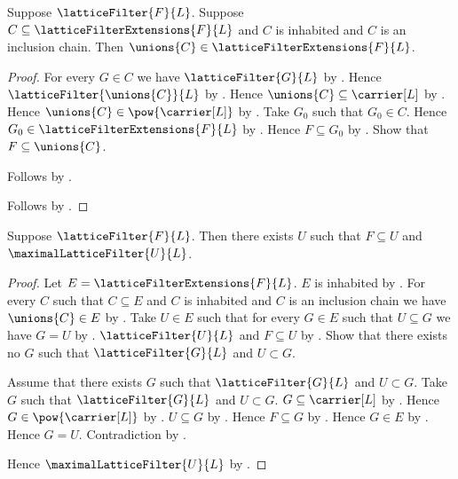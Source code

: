 \begin{theorem}\label{lattice_filter_extensions_chain_union}
    Suppose $\latticeFilter{F}{L}$.
    Suppose $C\subseteq\latticeFilterExtensions{F}{L}$ and
        $C$ is inhabited and $C$ is an inclusion chain.
    Then $\unions{C}\in\latticeFilterExtensions{F}{L}$.
\end{theorem}
\begin{proof}
    For every $G\in C$ we have $\latticeFilter{G}{L}$ by
        .
    Hence $\latticeFilter{\unions{C}}{L}$ by
        .
    Hence $\unions{C}\subseteq\carrier[L]$ by
        .
    Hence $\unions{C}\in\pow{\carrier[L]}$ by
        .
    Take $G_0$ such that $G_0\in C$.
    Hence $G_0\in\latticeFilterExtensions{F}{L}$ by .
    Hence $F\subseteq G_0$ by
        .
    Show that $F\subseteq\unions{C}$.
    \begin{subproof}
        Follows by .
    \end{subproof}
    Follows by .
\end{proof}

\begin{theorem}\label{lattice_filter_extension}
    Suppose $\latticeFilter{F}{L}$.
    Then there exists $U$ such that $F\subseteq U$ and
        $\maximalLatticeFilter{U}{L}$.
\end{theorem}
\begin{proof}
    Let $E=\latticeFilterExtensions{F}{L}$.
    $E$ is inhabited by
        .
    For every $C$ such that $C\subseteq E$ and $C$ is inhabited and
        $C$ is an inclusion chain we have $\unions{C}\in E$ by
        .
    Take $U\in E$ such that for every $G\in E$ such that
        $U\subseteq G$ we have $G=U$ by .
    $\latticeFilter{U}{L}$ and $F\subseteq U$ by
        .
    Show that there exists no $G$ such that
        $\latticeFilter{G}{L}$ and $U\subset G$.
    \begin{subproof}
        Assume that there exists $G$ such that
            $\latticeFilter{G}{L}$ and $U\subset G$.
        Take $G$ such that $\latticeFilter{G}{L}$ and $U\subset G$.
        $G\subseteq\carrier[L]$ by
            .
        Hence $G\in\pow{\carrier[L]}$ by .
        $U\subseteq G$ by .
        Hence $F\subseteq G$ by .
        Hence $G\in E$ by .
        Hence $G=U$.
        Contradiction by .
    \end{subproof}
    Hence $\maximalLatticeFilter{U}{L}$ by
        .
\end{proof}
